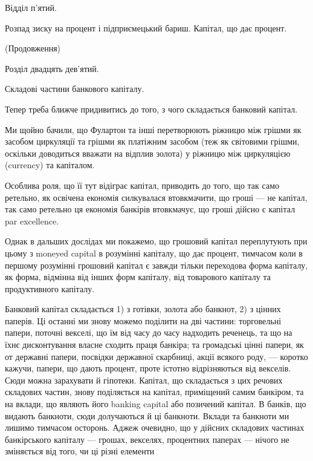 Відділ п’ятий.

Розпад зиску на процент і підприємецький
бариш. Капітал, що дає
процент.

(Продовження)

Розділ двадцять дев’ятий.

Складові частини банкового капіталу.

Тепер треба ближче придивитись до того, з чого складається банковий
капітал.

Ми щойно бачили, що Фулартон та інші перетворюють ріжницю між грішми
як засобом циркуляції та грішми як платіжним засобом (теж як світовими
грішми, оскільки доводиться вважати на відплив золота) у ріжницю між циркуляцією
(currency) та капіталом.

Особлива роля, що її тут відіграє капітал, приводить до того, що так само
ретельно, як освічена економія силкувалася втовкмачити, що гроші — не капітал,
так само ретельно ця економія банкірів втовкмачує, що гроші дійсно є капітал
par excellence.

Однак в дальших дослідах ми покажемо, що грошовий капітал переплутують
при цьому з moneyed capital в розумінні капіталу, що дає процент,
тимчасом коли в першому розумінні грошовий капітал є завжди тільки переходова
форма капіталу, як форма, відмінна від інших форм капіталу, від
товарового капіталу та продуктивного капіталу.

Банковий капітал складається 1) з готівки, золота або банкнот, 2) з
цінних паперів. Ці останні ми знову можемо поділити на дві частини: торговельні
папери, поточні векселі, що їм від часу до часу надходить реченець, та
що на їхнє дисконтування власне сходить праця банкіра; та громадські
цінні папери, як от державні папери, посвідки державної скарбниці, акції
всякого роду, — коротко кажучи, папери, що дають процент, проте істотно відрізняються
від векселів. Сюди можна зарахувати й гіпотеки. Капітал, що складається
з цих речових складових частин, знову поділяється на капітал, приміщений
самим банкіром, та на вклади, що являють його banking capital або
позичений капітал. В банків, що видають банкноти, сюди долучаються й ці
банкноти. Вклади та банкноти ми лишимо тимчасом осторонь. Аджеж очевидно,
що у дійсних складових частинах банкірського капіталу — грошах, векселях,
процентних паперах — нічого не зміняється від того, чи ці різні елементи
